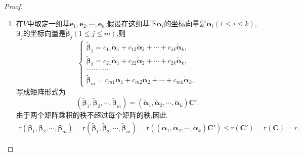 \documentclass[../../main.tex]{subfiles}%
\begin{document}
\begin{proof}
\begin{enumerate}[(1)]
\item 在\(V\)中取定一组基\(\boldsymbol{e}_1,\boldsymbol{e}_2,\cdots,\boldsymbol{e}_n\),假设在这组基下\(\boldsymbol{\alpha}_i\)的坐标向量是\(\widetilde{\boldsymbol{\alpha}}_i(1\leqslant  i\leqslant  k)\),\(\boldsymbol{\beta}_j\)的坐标向量是\(\widetilde{\boldsymbol{\beta}}_j(1\leqslant  j\leqslant  m)\),则
\[
\begin{cases}
\widetilde{\boldsymbol{\beta}}_1 = c_{11}\widetilde{\boldsymbol{\alpha}}_1 + c_{12}\widetilde{\boldsymbol{\alpha}}_2+\cdots + c_{1k}\widetilde{\boldsymbol{\alpha}}_k,\\
\widetilde{\boldsymbol{\beta}}_2 = c_{21}\widetilde{\boldsymbol{\alpha}}_1 + c_{22}\widetilde{\boldsymbol{\alpha}}_2+\cdots + c_{2k}\widetilde{\boldsymbol{\alpha}}_k,\\
\cdots\cdots\cdots\cdots\\
\widetilde{\boldsymbol{\beta}}_m = c_{m1}\widetilde{\boldsymbol{\alpha}}_1 + c_{m2}\widetilde{\boldsymbol{\alpha}}_2+\cdots + c_{mk}\widetilde{\boldsymbol{\alpha}}_k,
\end{cases}
\]
写成矩阵形式为
\[
(\widetilde{\boldsymbol{\beta}}_1,\widetilde{\boldsymbol{\beta}}_2,\cdots,\widetilde{\boldsymbol{\beta}}_m)=(\widetilde{\boldsymbol{\alpha}}_1,\widetilde{\boldsymbol{\alpha}}_2,\cdots,\widetilde{\boldsymbol{\alpha}}_k)\boldsymbol{C}'.
\]
由于两个矩阵乘积的秩不超过每个矩阵的秩,因此
\begin{align*}
\mathrm{r}\left( \boldsymbol{\beta }_1,\boldsymbol{\beta }_2,\cdots ,\boldsymbol{\beta }_m \right) =\mathrm{r}\left( \widetilde{\boldsymbol{\beta }}_1,\widetilde{\boldsymbol{\beta }}_2,\cdots ,\widetilde{\boldsymbol{\beta }}_m \right) =\mathrm{r}\left( \left( \widetilde{\boldsymbol{\alpha }}_1,\widetilde{\boldsymbol{\alpha }}_2,\cdots ,\widetilde{\boldsymbol{\alpha }}_k \right) \boldsymbol{C}' \right) \leqslant \mathrm{r}\left( \boldsymbol{C}'\right) =\mathrm{r}\left( \boldsymbol{C} \right) =r.
\end{align*}
\end{enumerate}

\end{proof}
\end{document}
